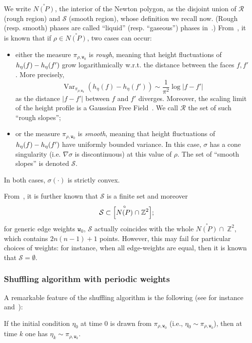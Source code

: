 \documentclass[10pt]{amsart}
\theoremstyle{definition}\newtheorem{defi}[theo]{Definition}\newtheorem{rema}[theo]{Remark}\newtheorem{exam}[theo]{Example}\newtheorem{exem}[theo]{Example}\newtheorem{nota}[theo]{Notation}
\newcommand{\ttw}{\mathtt{w}}
\newcommand{\bbZ}{\mathbb{Z}}
\newcommand{\clS}{\mathcal{S}}
\newcommand{\clR}{\mathcal{R}}
\DeclareMathOperator{\Var}{Var}
\begin{document}
We write $ \stackrel\circ{N(P)}$, the interior of the Newton polygon, as the disjoint union of $\clR$ (rough region) and $\clS$ (smooth region), whose definition we recall now. (Rough (resp. smooth) phases are called ``liquid'' (resp. ``gaseous'') phases in~\cite{KOS03}.)
From~\cite{KOS03}, it is known that if $\rho\in \stackrel\circ{N(P)}$, two cases can occur:
\begin{itemize}
\item either the measure $\pi_{\rho,\ttw_0}$ is \emph{rough}, meaning that height fluctuations of $h_\eta(f)\linebreak-h_{\eta}(f')$ grow logarithmically w.r.t. the distance between the faces $f,f'$. More precisely,
\begin{equation}
{\Var}_{\pi_{\rho,\ttw_0}}\left(h_\eta(f)-h_{\eta}(f')\right)\sim \frac1{\pi^2}\log \left|f-f'\right|
\end{equation}
as the distance $|f-f'|$ between $f$ and $f'$ diverges. Moreover, the scaling limit of the height profile is a Gaussian Free Field~\cite{KenLectures}. We call $\clR$ the set of such ``rough slopes'';
\item or the measure $\pi_{\rho,\ttw_0}$ is \emph{smooth}, meaning that height fluctuations of $h_\eta(f)\linebreak-h_{\eta}(f')$ have uniformly bounded variance. In this case, $\sigma$ has a cone singularity (i.e. $\nabla\sigma$ is discontinuous) at this value of $\rho$. The set of ``smooth slopes'' is denoted $\clS$.
\end{itemize}
{In both cases, $\sigma(\cdot)$ is strictly convex.}

From~\cite{KOS03}, it is further known that $\clS$ is a finite set and moreover
\begin{equation}\label{eq:rough}
\clS\subset \Bigl[\stackrel\circ{N(P)}\cap \;\bbZ^2\Bigr];
\end{equation}
for generic edge weights $\ttw_0$, $\clS$ actually coincides with the whole $\stackrel\circ{N(P)}\cap \;\bbZ^2$, which contains $2n(n-1)+1$ points. However, this may fail for particular choices of weights: for instance, when all edge-weights are equal, then it is known that $\clS=\emptyset$.



\subsubsection{Shuffling algorithm with periodic weights}

A remarkable feature of the shuffling algorithm is the following (see for instance \cite[Proposition~3.1]{CT:18} and~\cite[Proposition~2.2]{zhang2018domino}):
\begin{prop}\label{prop:misuramappata}
If the initial condition $\eta_0$ at time $0$ is drawn from $\pi_{\rho,\ttw_0}$ (i.e., $\eta_0\sim \pi_{\rho,\ttw_0}$), then at time $k$ one has $\eta_k\sim \pi_{\rho,\ttw_k}$.
\end{prop}
\end{document}
